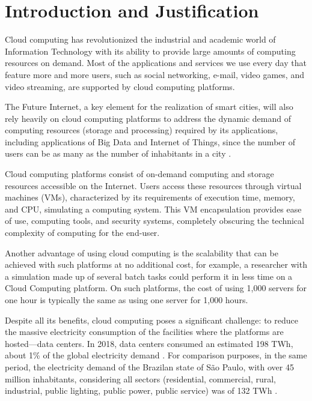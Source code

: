 \documentclass[12pt,a4paper]{article}
\begin{document}
\section{Introduction and Justification}
\doublespacing


Cloud computing has revolutionized the industrial and academic world of Information Technology with its ability to provide large amounts of computing resources on demand. Most of the applications and services we use every day that feature more and more users, such as social networking, e-mail, video games, and video streaming, are supported by cloud computing platforms.

The Future Internet, a key element for the realization of smart cities, will also rely heavily on cloud computing platforms to address the dynamic demand of computing resources (storage and processing) required by its applications, including applications of Big Data and Internet of Things, since the number of users can be as many as the number of inhabitants in a city \citep{the_future_internet_book}.


Cloud computing platforms consist of on-demand computing and storage resources accessible on the Internet. Users access these resources through virtual machines (VMs), characterized by its requirements of execution time, memory, and CPU, simulating a computing system. This VM encapsulation provides ease of use, computing tools, and security systems, completely obscuring the technical complexity of computing for the end-user. 


Another advantage of using cloud computing is the scalability that can be achieved with such platforms at no additional cost, for example, a researcher with a simulation made up of several batch tasks could perform it in less time on a Cloud Computing platform. On such platforms, the cost of using 1,000 servers for one hour is typically the same as using one server for 1,000 hours.


Despite all its benefits, cloud computing poses a significant challenge: to reduce the massive electricity consumption of the facilities where the platforms are hosted---data centers. In 2018, data centers consumed an estimated 198 TWh, about 1\% of the global electricity demand \citep{IEA}. For comparison purposes, in the same period, the electricity demand of the Brazilan state of São Paulo, with over 45 million inhabitants, considering all sectors (residential, commercial, rural, industrial, public lighting, public power, public service) was of 132 TWh \citep{SIMA}.
\end{document}
